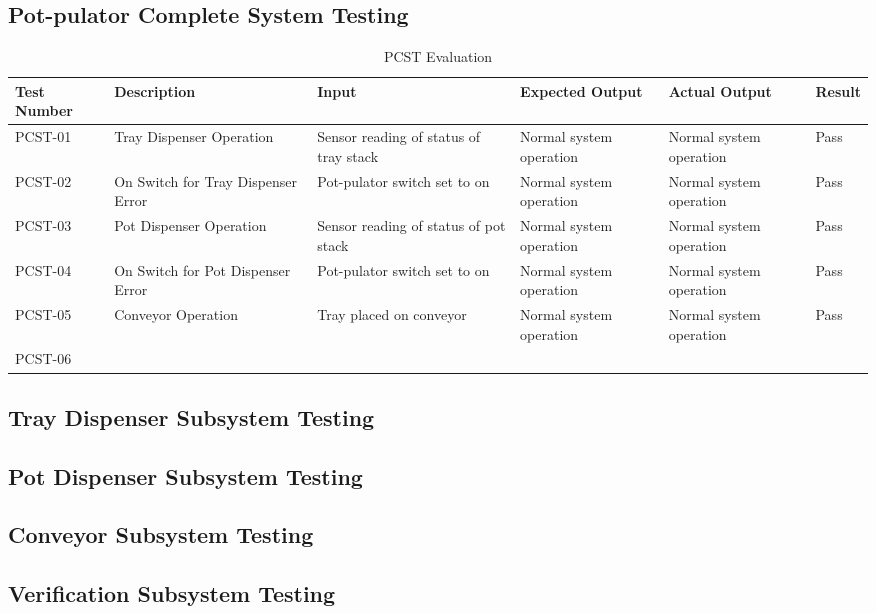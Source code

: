 \documentclass[12pt, titlepage]{article}
\begin{document}
\subsection{Pot-pulator Complete System Testing}

\begin{table}[h]
  \centering
  \begin{tabularx}{\textwidth}{|X|X|X|X|X|p{1cm}|}
    \hline
    Test Number & Description & Input & Expected Output & Actual Output & Result\\
    \hline
    PCST-01 & Tray Dispenser Operation & Sensor reading of status of tray stack & Normal system operation & Normal system operation & Pass \\
    \hline
    PCST-02 & On Switch for Tray Dispenser Error & Pot-pulator switch set to on & Normal system operation & Normal system operation & Pass\\
    \hline
    PCST-03 & Pot Dispenser Operation & Sensor reading of status of pot stack & Normal system operation & Normal system operation & Pass\\
    \hline
    PCST-04 & On Switch for Pot Dispenser Error & Pot-pulator switch set to on & Normal system operation & Normal system operation & Pass\\
    \hline
    PCST-05 & Conveyor Operation & Tray placed on conveyor &  Normal system operation & Normal system operation & Pass\\
    \hline
    PCST-06 & 
  \end{tabularx}
  \caption{PCST Evaluation}
  \label{tab:PCST}
\end{table}

\subsection{Tray Dispenser Subsystem Testing}

\subsection{Pot Dispenser Subsystem Testing}

\subsection{Conveyor Subsystem Testing}

\subsection{Verification Subsystem Testing}
\end{document}
